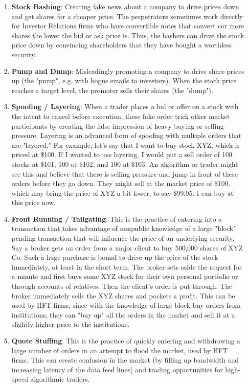 \documentclass{article}
\begin{document}
    \begin{enumerate}
      \item \textbf{Stock Bashing}: Creating fake news about a company to drive prices down and get shares for a cheaper price. The perpetrators sometimes work directly for Investor Relations firms who have convertible notes that convert cor more shares the lower the bid or ask price is. Thus, the bashers can drive the stock price down by convincing shareholders that they have bought a worthless security. 
      \item \textbf{Pump and Dump}: Misleadingly promoting a company to drive share prices up (the "pump", e.g. with bogus emails to investors). When the stock price reaches a target level, the promoter sells their shares (the "dump"). 
      
      \item \textbf{Spoofing / Layering}: When a trader places a bid or offer on a stock with the intent to cancel before execution, these fake order trick other market participants by creating the false impression of heavy buying or selling pressure. Layering is an advanced form of spoofing with multiple orders that are "layered." For example, let's say that I want to buy stock XYZ, which is priced at \$100. If I wanted to use layering, I would put a sell order of 100 stocks at \$101, 100 at \$102, and 100 at \$103. An algorithm or trader might see this and believe that there is selling pressure and jump in front of these orders before they go down. They might sell at the market price of \$100, which may bring the price of XYZ a bit lower, to say \$99.95. I can buy at this price now. 
      
      \item \textbf{Front Running / Tailgating}: This is the practice of entering into a transaction that takes advantage of nonpublic knowledge of a large "block" pending transaction that will influence the price of an underlying security. Say a broker gets an order from a major client to buy 500,000 shares of XYZ Co. Such a huge purchase is bound to drive up the price of the stock immediately, at least in the short term. The broker sets aside the request for a minute and first buys some XYZ stock for their own personal portfolio or through accounts of relatives. Then the client's order is put through. The broker immediately sells the XYZ shares and pockets a profit. This can be used by HFT firms, since with the knowledge of large block buy orders from institutions, they can "buy up" all the orders in the market and sell it at a slightly higher price to the institutions. 
      
      \item \textbf{Quote Stuffing}: This is the practice of quickly entering and withdrawing a large number of orders in an attempt to flood the market, used by HFT firms. This can create confusion in the market (by filling up bandwidth and increasing latency of the data feed lines) and trading opportunities for high-speed algorithmic traders. 
    \end{enumerate}
\end{document}
